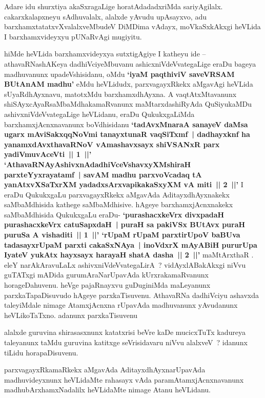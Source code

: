 \begin{artha}
Adare idu shurxtiya akaSxragaLige horatAdadadxriMda sariyAgilalx. cakarxkalapxneyu  sAdhuvalalx, alalxde yAvudu upAsayxvo, adu barxhamxtatatxvXvalalxveMbudeV DiMDima	vAdayx, moVkaSxkAkxgi heVLida I barxhamxvideyxyu pUNaRvAgi mugiyitu.
\end{artha}

\begin{artha}
hiMde heVLida barxhamxvideyxya sutxtigAgiye I katheyu ide -- athavaRNashAKeya dadhiVciyeMbuvanu ashicxniVdeVvategaLige eraDu bageya madhuvanunx upadeVshisidanu, oMdu \textbf{`iyaM paqthiviV saveVRSAM BUtAnAM madhu'} eMdu heVLidudx, parxvagayxRkekx aMgavAgi heVLida sUyaRdhAyxnavu, matotxMdu barxhamxdhAyxna. A vaqtAtxMtavanunx shiSAyxcAyaRsaMbaMdhakamaRvanunx maMtarxdashiRyAda QuSiyukaMDu  ashivxniVdeVvategaLige heVLidanu, eraDu QukukxgaLiMda barxhamxjAcnxnavanunx boVdhisidanu \textbf{`tadAvxMnaraA sanayeV daMsa ugarx mAviSakxqqNoVmi tanayxtunaR vaqSiTxmf~| dadhayxknf ha yanamxdAvxthavaRNoV vAmashavxsayx shiVSANxR parx yadiVmuvAceVti~|| 1~||' `AthavaRNAyAshivxnAdadhiVceVshavxyXMshiraH parxteYyxrayatamf~| savAM madhu parxvoVcadaq tA  yanAtxvXSaTxrXM yadadxsArxvapikakaSxyXM vA miti~|| 2~||'} I eraDu QukukxgaLu parxvagayxRkekx aMgavAda AditayxdhAyxnakekx saMbaMdhisida kathege saMbaMdhisive. hAgeye barxhamxjAcnxnakekx saMbaMdhisida QukukxgaLu eraDu- \textbf{`purashacxkeVrx divxpadaH purashacxkeVrx catuSapxdaH~| puraH sa pakiVSx BUtAvx puraH puruSa A vishaditi~|| 1~||' `rUpaM rUpaM parxtirUpoV baBUva tadasayxrUpaM parxti cakaSxNAya~| inoVdxrX mAyABiH pururUpa IyateV yukAtx hayxsayx harayaH shatA dasha~|| 2~||'}  maMtArxthaR . eleY narAkAravuLaLx ashivxniVdeVvategaLirA~? vidAyxlABakAkxgi niVvu guTATxgi mADida gurumAraNarUpavAda kUrxrakamaRvanunx horageDahuvenu. heVge pajaRnayxvu guDuginiMda maLeyanunx parxkaTapaDisuvudo hAgeye parxkaTisuvenu. AthavaRNa dadhiVciyu ashavxda taleyiMdale nimage AtamxjAcnxna rUpavAda madhuvanunx yAvudanunx heVLikoTaTxno. adanunx parxkaTisuvenu
\end{artha}

\begin{artha}
alalxde guruvina shirasasxnunx katatxrisi beVre kaDe mucicxTuTx kadureya taleyanunx taMdu guruvina katitxge seVrisidavaru niVvu alalxveV~? idanunx tiLidu horapaDisuvenu.
\end{artha}

\begin{artha}
parxvagayxRkamaRkekx aMgavAda AditayxdhAyxnarUpavAda madhuvideyxnunx heVLidaMte rahasayx vAda paramAtamxjAcnxnavanunx madhubArxhamxNadalilx heVLidaMte nimage Atanu heVLidanu.
\end{artha}

